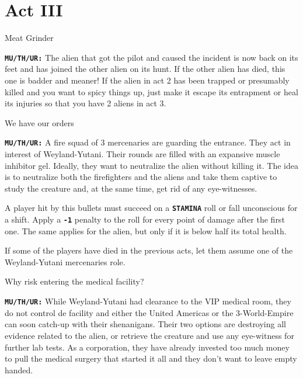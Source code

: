 \chapter{Act III}



\begin{rpg-commentbox}{Meat Grinder}

\texttt{\textbf{MU/TH/UR:}} The alien that got the pilot and caused the incident is now back on its feet and has joined the other alien on its hunt. 
If the other alien has died, this one is badder and meaner! If the alien in act 2 has been trapped or presumably killed and you want to spicy things up, just make it escape its entrapment or heal its injuries so that you have 2 aliens in act 3.

\end{rpg-commentbox}    


\begin{rpg-commentbox}{We have our orders}

\texttt{\textbf{MU/TH/UR:}} A fire squad of 3 mercenaries are guarding the entrance. They act in interest of Weyland-Yutani. Their rounds are filled with an expansive muscle inhibitor gel. Ideally, they want to neutralize the alien without killing it. The idea is to neutralize both the firefighters and the aliens and take them captive to study the creature and, at the same time, get rid of any eye-witnesses. 

A player hit by this bullets must succeed on a \texttt{\textbf{STAMINA}} roll or fall unconscious for a shift. Apply a \texttt{\textbf{-1}} penalty to the roll for every point of damage after the first one.
The same applies for the alien, but only if it is below half its total health.

If some of the players have died in the previous acts, let them assume one of the Weyland-Yutani mercenaries role.
\end{rpg-commentbox}   


\begin{rpg-commentbox}{Why risk entering the medical facility?}

\texttt{\textbf{MU/TH/UR:}} While Weyland-Yutani had clearance to the VIP medical room, they do not control de facility and either the United Americas or the 3-World-Empire can soon catch-up with their shenanigans. Their two options are destroying all evidence related to the alien, or retrieve the creature and use any eye-witness for further lab tests. As a corporation, they have already invested too much money to pull the medical surgery that started it all and they don't want to leave empty handed.
\end{rpg-commentbox}  

